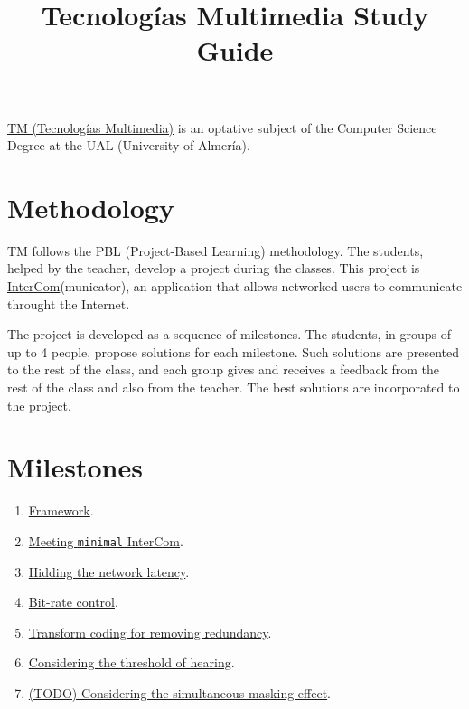 
\title{Tecnologías Multimedia \newline Study Guide}

\maketitle

\href{https://www.ual.es/estudios/grados/presentacion/plandeestudios/asignatura/4015/40154321}{TM
  (Tecnologías Multimedia)} is an optative subject of the Computer
Science Degree at the UAL (University of Almería).

\section{Methodology}
TM follows the PBL (Project-Based Learning) methodology. The students,
helped by the teacher, develop a project during the classes. This
project
is \href{https://github.com/Tecnologias-multimedia/intercom}{InterCom}(municator),
an application that allows networked users to communicate throught
the Internet.

The project is developed as a sequence of milestones. The students, in
groups of up to 4 people, propose solutions for each milestone. Such
solutions are presented to the rest of the class, and each group gives
and receives a feedback from the rest of the class and also from the
teacher. The best solutions are incorporated to the project.

\section{Milestones}

\begin{enumerate}
\item \href{https://tecnologias-multimedia.github.io/study_guide/framework/}{Framework}.
\item \href{https://tecnologias-multimedia.github.io/study_guide/minimal/}{Meeting \texttt{minimal} InterCom}.
\item \href{https://tecnologias-multimedia.github.io/study_guide/latency/}{Hidding the network latency}.
\item \href{https://tecnologias-multimedia.github.io/study_guide/BR_control/}{Bit-rate control}.
\item \href{https://tecnologias-multimedia.github.io/study_guide/transform_coding/}{Transform coding for removing redundancy}.
\item \href{https://tecnologias-multimedia.github.io/study_guide/threshold_of_hearing/}{Considering the threshold of hearing}.
\item \href{https://tecnologias-multimedia.github.io/study_guide/15-simultaneous_masking/}{(TODO) Considering the simultaneous masking effect}.
\end{enumerate}


